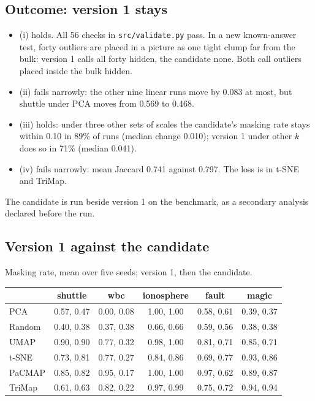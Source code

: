 \subsection*{Outcome: version 1 stays}

\begin{itemize}
  \item (i) holds. All 56 checks in \texttt{src/validate.py} pass. In a new
    known-answer test, forty outliers are placed in a picture as one tight
    clump far from the bulk: version 1 calls all forty hidden, the candidate
    none. Both call outliers placed inside the bulk hidden.
  \item (ii) fails narrowly: the other nine linear runs move by 0.083 at most,
    but shuttle under PCA moves from 0.569 to 0.468.
  \item (iii) holds: under three other sets of scales the candidate's
    masking rate stays within 0.10 in 89\% of runs (median change 0.010);
    version 1 under other $k$ does so in 71\% (median 0.041).
  \item (iv) fails narrowly: mean Jaccard 0.741 against 0.797. The loss is
    in t-SNE and TriMap.
\end{itemize}
The candidate is run beside version 1 on the benchmark, as a secondary
analysis declared before the run.

\subsection*{Version 1 against the candidate}

Masking rate, mean over five seeds; version 1, then the candidate.
\begin{center}
\small
\begin{tabular}{lccccc}
\hline
 & shuttle & wbc & ionosphere & fault & magic \\
\hline
PCA & 0.57, 0.47 & 0.00, 0.08 & 1.00, 1.00 & 0.58, 0.61 & 0.39, 0.37 \\
Random & 0.40, 0.38 & 0.37, 0.38 & 0.66, 0.66 & 0.59, 0.56 & 0.38, 0.38 \\
UMAP & 0.90, 0.90 & 0.77, 0.32 & 0.98, 1.00 & 0.81, 0.71 & 0.85, 0.71 \\
t-SNE & 0.73, 0.81 & 0.77, 0.27 & 0.84, 0.86 & 0.69, 0.77 & 0.93, 0.86 \\
PaCMAP & 0.85, 0.82 & 0.95, 0.17 & 1.00, 1.00 & 0.97, 0.62 & 0.89, 0.87 \\
TriMap & 0.61, 0.63 & 0.82, 0.22 & 0.97, 0.99 & 0.75, 0.72 & 0.94, 0.94 \\
\hline
\end{tabular}
\end{center}

